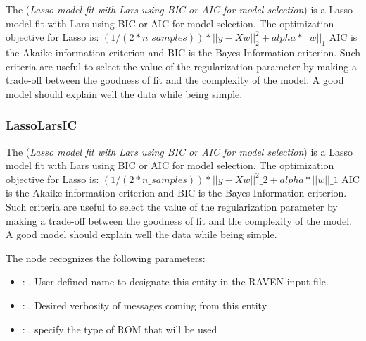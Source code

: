  The  (\textit{Lasso model fit with Lars using BIC or AIC for model selection})
 is a Lasso model fit with Lars using BIC or AIC for model selection.                         The
 optimization objective for Lasso is:                         $(1 / (2 * n\_samples)) * ||y -
 Xw||^2_2 + alpha * ||w||_1$                         AIC is the Akaike information criterion and BIC
 is the Bayes Information criterion. Such criteria                         are useful to select the
 value of the regularization parameter by making a trade-off between the
 goodness of fit and the complexity of the model. A good model should explain well the data
 while being simple.                         

\subsubsection{LassoLarsIC}
  The  (\textit{Lasso model fit with Lars using BIC or AIC for model
  selection})                         is a Lasso model fit with Lars using BIC or AIC for model
  selection.                         The optimization objective for Lasso is:
  $(1 / (2 * n\_samples)) * ||y - Xw||^2\_2 + alpha * ||w||\_1$                         AIC is the
  Akaike information criterion and BIC is the Bayes Information criterion. Such criteria
  are useful to select the value of the regularization parameter by making a trade-off between the
  goodness of fit and the complexity of the model. A good model should explain well the data
  while being simple.                         

  The  node recognizes the following parameters:
    \begin{itemize}
      \item {}: , 
        User-defined name to designate this entity in the RAVEN input file.
      \item {}: , 
        Desired verbosity of messages coming from this entity
      \item {}: , 
        specify the type of ROM that will be used
  \end{itemize}


